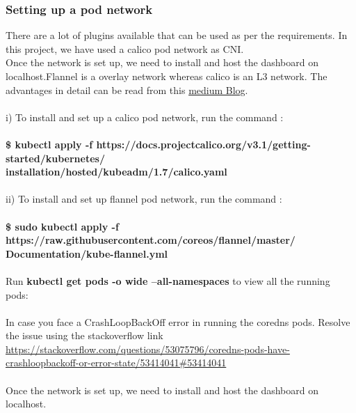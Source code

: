 \documentclass[12pt]{report}
\begin{document}
\subsubsection{Setting up a pod network}
There are a lot of plugins available that can be used as per the requirements. In this project, we have used a calico pod network as CNI.\\
Once the network is set up, we need to install and host the dashboard on localhost.Flannel is a overlay network whereas calico is an L3 network. The advantages in detail can be read from this  \href{https://medium.com/@jain.sm/flannel-vs-calico-a-battle-of-l2-vs-l3-based-networking-5a30cd0a3ebd}{medium Blog}.\\\\
i) To install and set up a calico pod network, run the command :\\\\
\textbf{\$ kubectl apply -f https://docs.projectcalico.org/v3.1/getting-started/kubernetes/\\installation/hosted/kubeadm/1.7/calico.yaml}\\\\
ii) To install and set up flannel pod network, run the command :\\\\
\textbf{\$ sudo kubectl apply -f https://raw.githubusercontent.com/coreos/flannel/master/\\Documentation/kube-flannel.yml}\\\\
Run \textbf{kubectl get pods -o wide --all-namespaces} to view all the running pods:\\\\
In case you face a CrashLoopBackOff error in running the coredns pods. Resolve the issue using the stackoverflow link \href{https://stackoverflow.com/questions/53075796/coredns-pods-have-crashloopbackoff-or-error-state/53414041#53414041}{https://stackoverflow.com/questions/53075796/coredns-pods-have-crashloopbackoff-or-error-state/53414041\#53414041}\cite{Coredns} \\\\
Once the network is set up, we need to install and host the dashboard on localhost.
\end{document}

